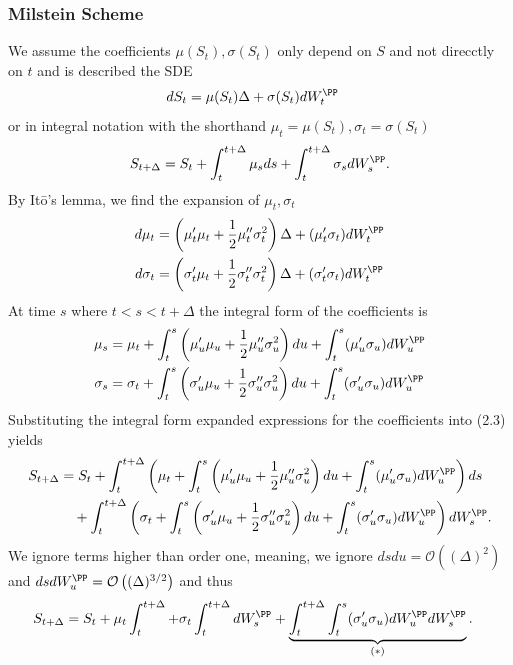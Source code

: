 \documentclass[11pt]{article}
\numberwithin{equation}{section}
\begin{document}
\subsubsection{Milstein Scheme}
We assume the coefficients $\mu(S_t),\sigma(S_t)$ only depend on $S$ and not
direcctly on $t$ and is described the SDE
\begin{align}
    dS_t &= \mu(S_t)\Delta+\sigma(S_t)dW_t^\PP
\end{align}
or in integral notation with the shorthand $\mu_t=\mu(S_t),\sigma_t=\sigma(S_t)$
\begin{align*}
    S_{t+\Delta}=S_t+\int_t^{t+\Delta}\mu_s ds+\int_t^{t+\Delta}\sigma_s dW_s^\PP.
\end{align*}
By Itō's lemma, we find the expansion of $\mu_t,\sigma_t$
\begin{align*}
    d\mu_t &= \left ( \mu_t'\mu_t+\frac{1}{2}\mu_t''\sigma_t^2 \right )\Delta+(\mu_t'\sigma_t)dW_t^\PP\\
    d\sigma_t &=\left ( \sigma_t'\mu_t+\frac{1}{2}\sigma_t''\sigma_t^2 \right )\Delta+(\sigma_t'\sigma_t)dW_t^\PP
\end{align*}
At time $s$ where $t<s<t+\Delta$ the integral form of the coefficients is
\begin{align*}
    \mu_s &=\mu_t+\int_t^s \left ( \mu_u'\mu_u+\frac{1}{2}\mu_u''\sigma_u^2\right )du+\int_t^s (\mu_u'\sigma_u)dW_u^\PP\\
    \sigma_s &= \sigma_t + \int_t^{s} \left ( \sigma_u'\mu_u+\frac{1}{2}\sigma_u''\sigma_u^2 \right )du+ \int_t^s (\sigma_u'\sigma_u)dW_u^\PP
\end{align*}
Substituting the integral form expanded expressions for the coefficients into
(2.3) yields
\begin{align*}
    S_{t+\Delta}&=S_t+\int_t^{t+\Delta}\left ( \mu_t+\int_t^s \left ( \mu_u'\mu_u+\frac{1}{2}\mu_u''\sigma_u^2\right )du+\int_t^s (\mu_u'\sigma_u)dW_u^\PP\right )ds\\
    &\quad + \int_t^{t+\Delta}\left (  \sigma_t + \int_t^{s} \left ( \sigma_u'\mu_u+\frac{1}{2}\sigma_u''\sigma_u^2 \right )du+ \int_t^s (\sigma_u'\sigma_u)dW_u^\PP \right )dW_s^\PP.
\end{align*}
We ignore terms higher than order one, meaning, we ignore $dsdu=\mathcal{O}\left
((\Delta)^2 \right )$ and $dsdW_u^\PP=\mathcal{O} \left ( (\Delta)^{3/2} \right )$ and
thus
\begin{align}
    S_{t+\Delta}&=S_t+\mu_t \int_t^{t+\Delta}+\sigma_t \int_t^{t+\Delta}dW_s^\PP+\underbrace{\int_t^{t+\Delta}\int_t^s (\sigma_u'\sigma_u)dW_u^\PP dW_s^\PP}_{(*)}.
\end{align}
\end{document}
